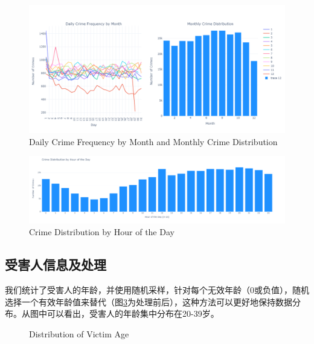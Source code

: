\documentclass{article}
\begin{document}
\begin{figure}[H]
    \centering
    \includegraphics[width=1\textwidth]{../pic/date.png}
    \caption{Daily Crime Frequency by Month and Monthly Crime Distribution}
    \label{fig:date}
\end{figure}

\begin{figure}[H]
    \centering
    \includegraphics[width=1\textwidth]{../pic/hour.png}
    \caption{Crime Distribution by Hour of the Day}
    \label{fig:hour}
\end{figure}

\subsection{受害人信息及处理}
我们统计了受害人的年龄，并使用随机采样，针对每个无效年龄（0或负值），随机选择一个有效年龄值来替代（图\ref{fig:age}为处理前后），这种方法可以更好地保持数据分布。从图中可以看出，受害人的年龄集中分布在20-39岁。

\begin{figure}[htbp]
    \centering

    \hspace{0.5cm}

    \caption{Distribution of Victim Age}
    \label{fig:age}
\end{figure}
\end{document}
